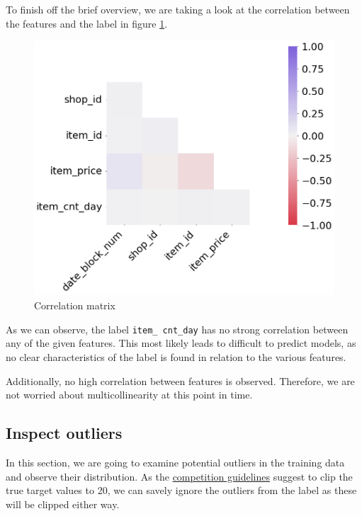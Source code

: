 To finish off the brief overview, we are taking a look at the correlation between the features and the label in figure \ref{corr_matrix}.

\begin{figure}
\centering
  \includegraphics[width=0.85\linewidth]{external_content/graphs/corr_matrix.png}
\captionsetup{justification=centering}
\caption{Correlation matrix}
\label{corr_matrix}
\end{figure}

\vspace*{6mm}
\noindent As we can observe, the label \texttt{item\_ cnt\_day} has no strong correlation between any of the given features. 
This most likely leads to difficult to predict models, as no clear characteristics of the label is found in relation to the various features.

\noindent Additionally, no high correlation between features is observed. Therefore, we are not worried about multicollinearity at this point in time. \cite{MultivariateStatistics}

\subsection{Inspect outliers}\label{sec:outliers}

In this section, we are going to examine potential outliers in the training data and observe their distribution. As the \href{https://www.kaggle.com/c/competitive-data-science-predict-future-sales/overview/evaluation}{competition guidelines} suggest to clip the true target values to 20, we can savely ignore the outliers from the label as these will be clipped either way.


